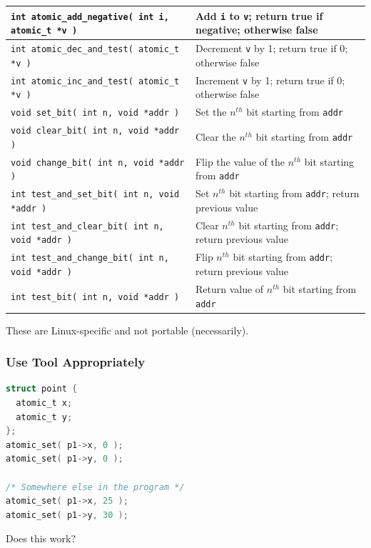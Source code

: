 \begin{frame}
{\begin{center}
\begin{tabular}{l|l}
				\texttt{int atomic\_add\_negative( int i, atomic\_t *v )}  & Add \texttt{i} to \texttt{v}; return true if negative; otherwise false \\\hline

				\texttt{int atomic\_dec\_and\_test( atomic\_t *v )}        & Decrement \texttt{v} by 1; return true if 0; otherwise false           \\\hline

				\texttt{int atomic\_inc\_and\_test( atomic\_t *v )}        & Increment \texttt{v} by 1; return true if 0; otherwise false           \\ \hline\hline

				\texttt{void set\_bit( int n, void *addr )}                & Set the $n^{th}$ bit starting from \texttt{addr}                       \\\hline

				\texttt{void clear\_bit( int n, void *addr )}              & Clear the $n^{th}$ bit starting from \texttt{addr}                     \\\hline

				\texttt{void change\_bit( int n, void *addr )}             & Flip the value of the $n^{th}$ bit starting from \texttt{addr}         \\\hline

				\texttt{int test\_and\_set\_bit( int n, void *addr )}      & Set $n^{th}$ bit starting from \texttt{addr}; return previous value    \\\hline

				\texttt{int test\_and\_clear\_bit( int n, void *addr )}    & Clear $n^{th}$ bit starting from \texttt{addr}; return previous value  \\\hline

				\texttt{int test\_and\_change\_bit( int n, void *addr )}   & Flip $n^{th}$ bit starting from \texttt{addr}; return previous value   \\\hline

				\texttt{int test\_bit( int n, void *addr )}                & Return value of $n^{th}$ bit starting from \texttt{addr}               \\\hline
			\end{tabular}
		\end{center}
	}

	These are Linux-specific and not portable (necessarily).

\end{frame}


\begin{frame}[fragile]
	\frametitle{Use Tool Appropriately}

	\begin{lstlisting}[language=C]
struct point {
  atomic_t x;
  atomic_t y;
};
atomic_set( p1->x, 0 );
atomic_set( p1->y, 0 );

/* Somewhere else in the program */
atomic_set( p1->x, 25 );
atomic_set( p1->y, 30 );
\end{lstlisting}

	Does this work?

\end{frame}


